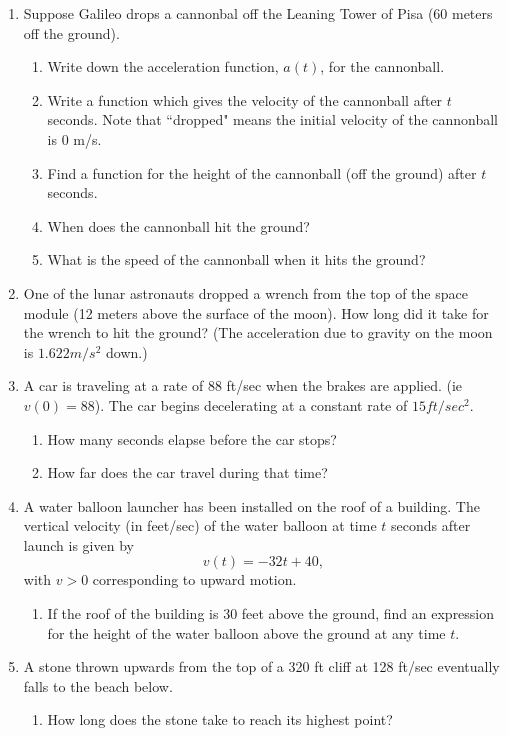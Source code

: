 \documentclass{article}[12pt]
\theoremstyle{definition}
\theoremstyle{example}
\theoremstyle{theorem}
\begin{document}
\begin{enumerate}
\item Suppose Galileo drops a cannonbal off the Leaning Tower of Pisa (60 meters off the ground). 
\begin{enumerate}
\item Write down the acceleration function, $a(t)$, for the cannonball. 
\item Write a function which gives the velocity of the cannonball after $t$ seconds. Note that 	``dropped" means the initial velocity of the cannonball is 0 m/s. 
\item Find a function for the height of the cannonball (off the ground) after $t$ seconds. 
\item When does the cannonball hit the ground?
\item What is the speed of the cannonball when it hits the ground?
\end{enumerate}
\item One of the lunar astronauts dropped a wrench from the top of the space module (12 meters above the surface of the moon). How long did it take for the wrench to hit the ground? (The acceleration due to gravity on the moon is $1.622m/s^2$
down.)
\item A car is traveling at a rate of $88$ ft/sec when the brakes are applied. (ie $v(0)=88$). The car begins decelerating at a constant rate of $15ft/sec^2$. 
\begin{enumerate}
\item How many seconds elapse before the car stops?
\item How far does the car travel during that time?
\end{enumerate} 
\item A water balloon launcher has been installed on the roof of a building. The vertical velocity (in feet/sec) of the water balloon at time $t$ seconds after launch is given by \[v(t)=-32t+40,\] with $v>0$ corresponding to upward motion. 
\begin{enumerate}
\item If the roof of the building is 30 feet above the ground, find an expression for the height of the water balloon above the ground at any time $t$. 
\end{enumerate}
\item A stone thrown upwards from the top of a 320 ft cliff at 128 ft/sec eventually falls to the beach below. 
\begin{enumerate}
\item How long does the stone take to reach its highest point?

\end{enumerate}
\end{enumerate}
\end{document}
